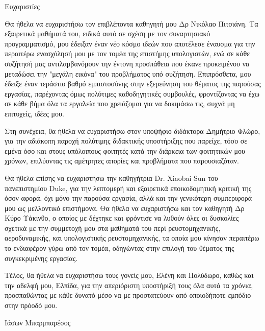 \vspace*{\fill}  
Ευχαριστίες

Θα ήθελα να ευχαριστήσω τον επιβλέποντα καθηγητή μου Δρ Νικόλαο Πιτσιάνη.
Τα εξαιρετικά μαθήματά του, ειδικά αυτό σε σχέση με τον συναρτησιακό προγραμματισμό, μου έδειξαν έναν νέο κόσμο ιδεών που αποτέλεσε έναυσμα για την περαιτέρω ενασχόλησή μου με τον τομέα της επιστήμης υπολογιστών, ενώ σε κάθε συζήτησή μας αντιλαμβανόμουν την έντονη προσπάθεια που έκανε προκειμένου να μεταδώσει την "μεγάλη εικόνα" του προβλήματος υπό συζήτηση.
Επιπρόσθετα, μου έδειξε έναν τεράστιο βαθμό εμπιστοσύνης στην εξερεύνηση του θέματος της παρούσας εργασίας, παρέχοντας όμως πολύτιμες καθοδηγητικές συμβουλές, φροντίζοντας να έχω σε κάθε βήμα όλα τα εργαλεία που χρειάζομαι για να δοκιμάσω τις, συχνά μη επιτυχείς, ιδέες μου.

Στη συνέχεια, θα ήθελα να ευχαριστήσω στον υποψήφιο διδάκτορα Δημήτριο Φλώρο, για την αδιάκοπη παροχή πολύτιμης διδακτικής υποστήριξης που παρείχε, τόσο σε εμένα όσο και στους υπόλοιπους φοιτητές κατά την διάρκεια των φοιτητικών μου χρόνων, επιλύοντας τις αμέτρητες απορίες και προβλήματα που παρουσιαζόταν.

Θα ήθελα επίσης να ευχαριστήσω την καθηγήτρια Dr. Xiaobai Sun του πανεπιστημίου Duke, για την λεπτομερή και εξαιρετικά εποικοδομητική κριτική της όσον αφορά, όχι μόνο την παρούσα εργασία, αλλά και την γενικότερη συμπεριφορά μου ως μελλοντικό επιστήμονα.
Θα ήθελα να ευχαριστήσω και τον καθηγητή Δρ Κύρο Υάκινθο, ο οποίος με δέχτηκε και φρόντισε να λυθούν όλες οι δυσκολίες σχετικά με την συμμετοχή μου στα μαθήματά του περί ρευστομηχανικής, αεροδυναμικής, και υπολογιστικής ρευστομηχανικής, τα οποία μου κίνησαν περαιτέρω το ενδιαφέρον γύρω από τον τομέα, οδηγώντας στην επιλογή του θέματος της συγκεκριμένης εργασίας.

Τέλος, θα ήθελα να ευχαριστήσω τους γονείς μου, Ελένη και Πολύδωρο, καθώς και την αδελφή μου, Ελπίδα, για την απεριόριστη υποστήριξή τους όλα αυτά τα χρόνια, προσπαθώντας με κάθε δυνατό μέσο να με προστατεύουν από οποιοδήποτε εμπόδιο στην πρόοδό μου.

\begin{flushright}
Ιάσων Μπαρμπαρέσος
\end{flushright}
\vspace*{\fill}

\newpage

